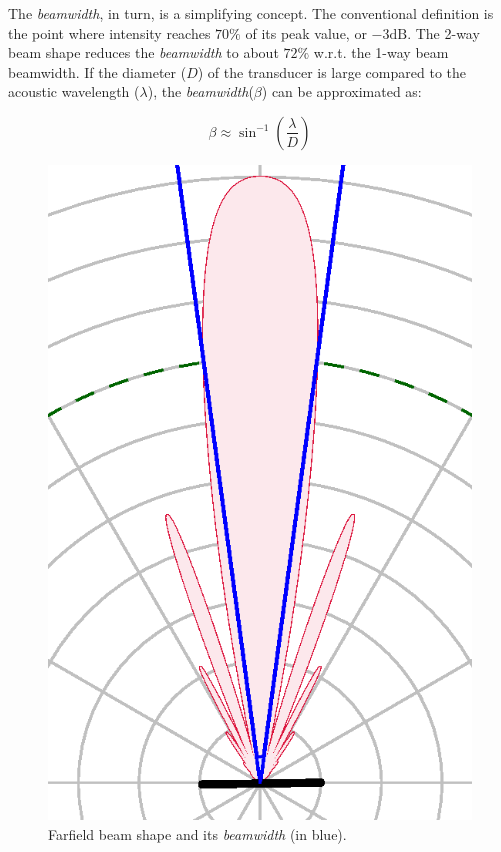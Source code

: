 The \textit{beamwidth}, in turn, is a simplifying concept. The conventional
definition is the point where intensity reaches $70\%$ of its peak value,
or $-3\text{dB}$. The 2-way beam shape reduces the \textit{beamwidth} to about
$72\%$ w.r.t. the 1-way beam beamwidth. If the diameter ($D$) of the transducer
is large compared to the acoustic wavelength ($\lambda$), the
\textit{beamwidth}($\beta$) can be approximated as:

\[ \beta \approx \sin^{-1}\left(\frac{\lambda}{D} \right) \]

\begin{figure}[h]
	\centering
	\includegraphics[scale=0.6,trim={0.46 0.072 0.46
	1.03},clip]{Chap2/fig/directivity.eps}
	\caption{Farfield beam shape and its \textit{beamwidth} (in blue).}
	\label{fig:beamwidth}
\end{figure}

